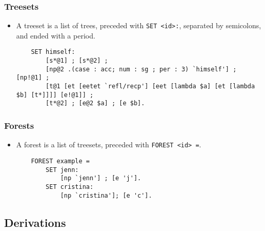 \documentclass[10.5pt]{article}
\newcommand{\code}[1]{\texttt{#1}}
\begin{document}
\subsubsection{Treesets}
  \begin{itemize}
	\item A treeset is a list of trees, preceded with \code{SET <id>:}, separated by semicolons, and ended with a period.
	
	\begin{mdframed}[backgroundcolor=blue!5] 
	\begin{verbatim}
	SET himself:
	    [s*@1] ; [s*@2] ;
	    [np@2 .(case : acc; num : sg ; per : 3) `himself'] ; [np!@1] ;
	    [t@1 [et [eetet `refl/recp'] [eet [lambda $a] [et [lambda $b] [t*]]]] [e!@1]] ;
	    [t*@2] ; [e@2 $a] ; [e $b].
	\end{verbatim}
	\end{mdframed}
  \end{itemize}

\subsubsection{Forests}
  \begin{itemize}
	\item A forest is a list of treesets, preceded with \code{FOREST <id> =}.
    
    \begin{mdframed}[backgroundcolor=blue!5] 
    \begin{verbatim}
	FOREST example =
	    SET jenn:
	        [np `jenn'] ; [e 'j'].
	    SET cristina:
	        [np `cristina']; [e 'c'].
	\end{verbatim}
	\end{mdframed}
  \end{itemize}

\subsection{Derivations}			
\end{document}
